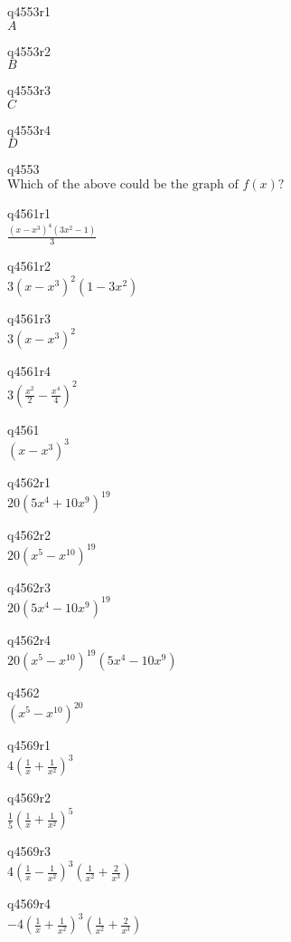 q4553r1\\
\(\displaystyle A \)

q4553r2\\
\(\displaystyle B \)

q4553r3\\
\(\displaystyle C \)

q4553r4\\
\(\displaystyle D \)

q4553\\
\(\displaystyle \text{Which of the above could be the graph of } f(x)? \)

q4561r1\\
\(\displaystyle \frac{(x - x^3)^4(3x^2 - 1)}{3} \)

q4561r2\\
\(\displaystyle 3(x - x^3)^2(1 - 3x^2) \)

q4561r3\\
\(\displaystyle 3(x - x^3)^2 \)

q4561r4\\
\(\displaystyle 3 \left ( \frac{x^2}{2} - \frac{x^4}{4} \right ) ^2 \)

q4561\\
\(\displaystyle (x - x^3)^3 \)

q4562r1\\
\(\displaystyle 20(5x^4 + 10x^9)^{19} \)

q4562r2\\
\(\displaystyle 20(x^5 - x^{10})^{19} \)

q4562r3\\
\(\displaystyle 20(5x^4 - 10x^9)^{19} \)

q4562r4\\
\(\displaystyle 20(x^5 - x^{10})^{19} (5x^4 - 10x^9) \)

q4562\\
\(\displaystyle (x^5 - x^{10})^{20} \)

q4569r1\\
\(\displaystyle 4 \left ( \frac{1}{x} + \frac{1}{x^2} \right ) ^3 \)

q4569r2\\
\(\displaystyle \frac{1}{5} \left ( \frac{1}{x} + \frac{1}{x^2} \right ) ^5 \)

q4569r3\\
\(\displaystyle 4 \left ( \frac{1}{x} - \frac{1}{x^2} \right)^3 \left ( \frac{1}{x^2} + \frac{2}{x^3} \right ) \)

q4569r4\\
\(\displaystyle -4\left ( \frac{1}{x} + \frac{1}{x^2} \right )^3 \left ( \frac{1}{x^2} + \frac{2}{x^3} \right ) \)

